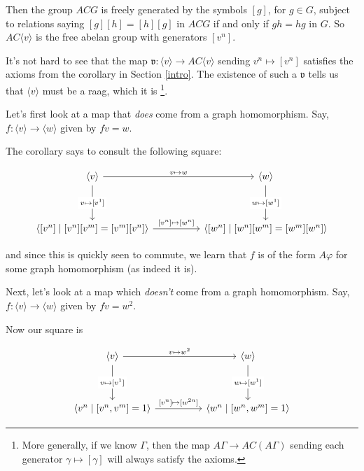 \documentclass[12pt]{article}
\theoremstyle{definition}
\theoremstyle{theorem}
\begin{document}
Then the group $ACG$ is freely generated by the symbols $[g]$, for $g \in G$,
subject to relations saying $[g][h] = [h][g]$ in $ACG$ if and only if 
$gh = hg$ in $G$. So $AC \langle v \rangle$ is the free abelan group with 
generators $[v^n]$.

It's not hard to see that the map 
$\mathfrak{v} : \langle v \rangle \to AC \langle v \rangle$
sending $v^n \mapsto [v^n]$ satisfies the axioms from the corollary in 
Section \ref{intro}. The existence of such a $\mathfrak{v}$ tells us that 
$\langle v \rangle$ must be a raag, which it is%
\footnote{More generally, if we know $\Gamma$, then the map 
$A\Gamma \to AC(A\Gamma)$ sending each generator $\gamma \mapsto [\gamma]$ 
will always satisfy the axioms.}.

\bigskip

Let's first look at a map that \emph{does} come from a graph homomorphism.
Say, $f : \langle v \rangle \to \langle w \rangle$ given by $fv = w$.

The corollary says to consult the following square:

\[
  \begin{tikzcd}
    {\langle v \rangle} && {\langle w \rangle} \\
    \\
    {\left \langle [v^n] \mid [v^n][v^m] = [v^m][v^n] \right \rangle} 
    && 
    {\left \langle [w^n] \mid [w^n][w^m] = [w^m][w^n] \right \rangle}
    \arrow["{v \mapsto w}", from=1-1, to=1-3]
    \arrow["{[v^n] \mapsto [w^n]}", from=3-1, to=3-3]
    \arrow["{v \mapsto [v^1]}"{description}, from=1-1, to=3-1]
    \arrow["{w \mapsto [w^1]}"{description}, from=1-3, to=3-3]
  \end{tikzcd}
\]

and since this is quickly seen to commute, we learn that $f$ is of the form 
$A \varphi$ for some graph homomorphism (as indeed it is).

\bigskip

Next, let's look at a map which \emph{doesn't} come from a graph homomorphism.
Say, $f : \langle v \rangle \to \langle w \rangle$ given by $fv = w^2$.

Now our square is

\[\begin{tikzcd}
	{\langle v \rangle} && {\langle w \rangle} \\
	\\
	{\langle v^n \mid [v^n,v^m] = 1 \rangle} && {\langle w^n \mid [w^n, w^m] = 1 \rangle}
	\arrow["{v \mapsto w^2}", from=1-1, to=1-3]
  \arrow["{[v^n] \mapsto [w^{2n}]}", from=3-1, to=3-3]
	\arrow["{v \mapsto [v^1]}"{description}, from=1-1, to=3-1]
	\arrow["{w \mapsto [w^1]}"{description}, from=1-3, to=3-3]
\end{tikzcd}\]
\end{document}
